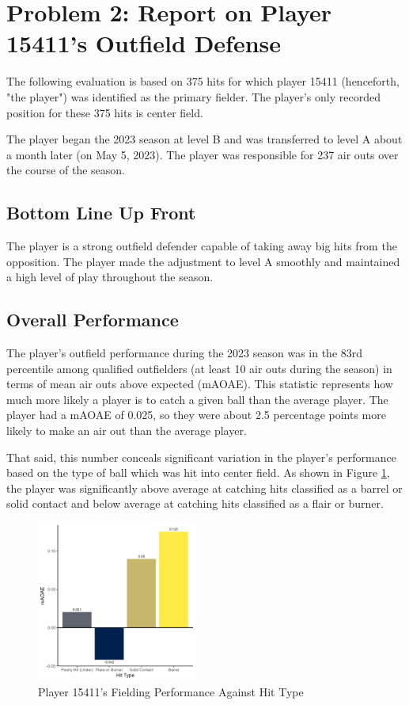
\section*{Problem 2: Report on Player 15411's Outfield Defense}
\label{sec:expts}

The following evaluation is based on 375 hits for which player 15411 (henceforth, "the player") was identified as the primary fielder. The player's only recorded position for these 375 hits is center field.

The player began the 2023 season at level B and was transferred to level A about a month later (on May 5, 2023). The player was responsible for 237 air outs over the course of the season.

\subsection{Bottom Line Up Front}

The player is a strong outfield defender capable of taking away big hits from the opposition. The player made the adjustment to level A smoothly and maintained a high level of play throughout the season.

\subsection{Overall Performance}
\label{sec:overallperformance}

The player's outfield performance during the 2023 season was in the 83rd percentile among qualified outfielders (at least 10 air outs during the season) in terms of mean air outs above expected (mAOAE). This statistic represents how much more likely a player is to catch a given ball than the average player. The player had a mAOAE of 0.025, so they were about 2.5 percentage points more likely to make an air out than the average player.

That said, this number conceals significant variation in the player's performance based on the type of ball which was hit into center field. As shown in Figure \ref{fig:hittype}, the player was significantly above average at catching hits classified as a barrel or solid contact and below average at catching hits classified as a flair or burner.

\begin{figure}[htb]
    \includegraphics[width = 0.47\textwidth]{../../output/figs/hit_type_15411.png}
    \caption{Player 15411's Fielding Performance Against Hit Type}
    \label{fig:hittype}
\end{figure}

